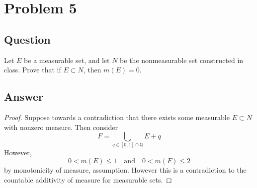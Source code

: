 \documentclass[12pt]{article}
\begin{document}
\section{Problem 5}
\subsection{Question}
Let $E$ be a measurable set, and let $N$ be the nonmeasurable set constructed in class. Prove that if $E \subset N$, then $m(E)=0$.
\subsection{Answer}
\begin{proof}
Suppose towards a contradiction that there exists some measurable $E \subset N$ with nonzero measure. Then consider 
\[F=\bigcup_{q \in [0,1] \cap \mathbb{Q}} E +q\]
However, 
\[0<m(E)\leq1 \quad \mathrm{and} \quad  0< m(F) \leq 2\]
by monotonicity of measure, assumption. However this is a contradiction to the countable additivity of measure for measurable sets.
\end{proof}
\end{document}
